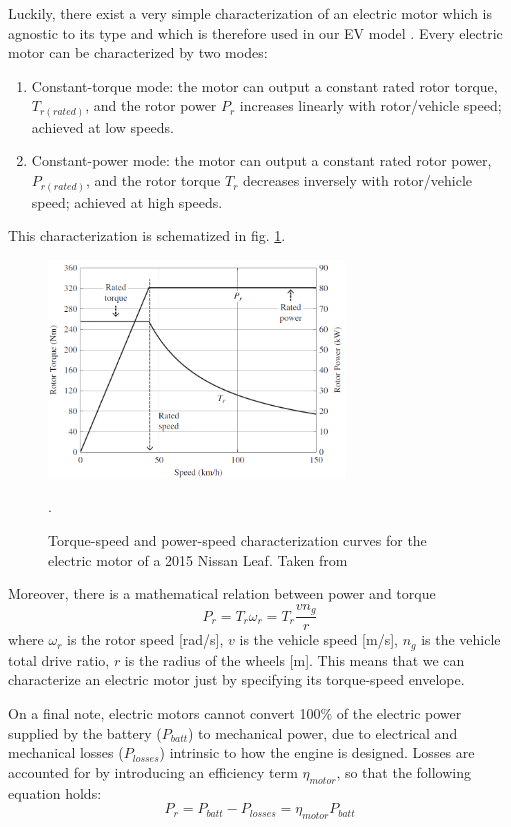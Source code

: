 Luckily, there exist a very simple characterization of an electric motor which is agnostic to its type and which is therefore used in our EV model \cite{hayes_ev_book}. Every electric motor can be characterized by two modes:
\begin{enumerate}
    \item Constant-torque mode: the motor can output a constant rated rotor torque, $T_{r(rated)}$, and the rotor power $P_r$ increases linearly with rotor/vehicle speed; achieved at low speeds.
    \item Constant-power mode: the motor can output a constant rated rotor power, $P_{r(rated)}$, and the rotor torque $T_r$ decreases inversely with rotor/vehicle speed; achieved at high speeds.
\end{enumerate}
This characterization is schematized in fig. \ref{fig:motor_characterization}.

\begin{figure}[htb]
    \centering
    \includegraphics[width=0.7\textwidth]{images/motor_characterization}
    \caption[Torque-speed and power-speed envelopes]{Torque-speed and power-speed characterization curves for the electric motor of a 2015 Nissan Leaf. Taken from \cite{hayes_ev_book}}.
    \label{fig:motor_characterization}
\end{figure}

Moreover, there is a mathematical relation between power and torque
\begin{equation}
    P_r = T_r\omega_r = T_r \frac{v n_g}{r}
\end{equation}
where $\omega_r$ is the rotor speed [rad/s], $v$ is the vehicle speed [m/s], $n_g$ is the vehicle total drive ratio, $r$ is the radius of the wheels [m]. This means that we can characterize an electric motor just by specifying its torque-speed envelope.

On a final note, electric motors cannot convert 100\% of the electric power supplied by the battery ($P_{batt}$) to mechanical power, due to electrical and mechanical losses ($P_{losses}$) intrinsic to how the engine is designed. Losses are accounted for by introducing an efficiency term $\eta_{motor}$, so that the following equation holds:
\begin{equation}
P_r = P_{batt} - P_{losses} = \eta_{motor} P_{batt}
\end{equation}

